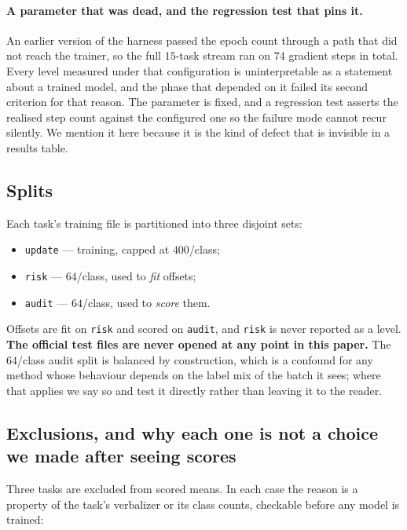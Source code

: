 \paragraph{A parameter that was dead, and the regression test that pins it.}
An earlier version of the harness passed the epoch count through a path that did
not reach the trainer, so the full $15$-task stream ran on $74$ gradient steps in
total. Every level measured under that configuration is uninterpretable as a
statement about a trained model, and the phase that depended on it failed its
second criterion for that reason. The parameter is fixed, and a regression test
asserts the realised step count against the configured one so the failure mode
cannot recur silently. We mention it here because it is the kind of defect that is
invisible in a results table.

\subsection{Splits}
\label{app:splits}

Each task's training file is partitioned into three disjoint sets:
\begin{itemize}
  \item \texttt{update} --- training, capped at $400$/class;
  \item \texttt{risk} --- $64$/class, used to \emph{fit} offsets;
  \item \texttt{audit} --- $64$/class, used to \emph{score} them.
\end{itemize}
Offsets are fit on \texttt{risk} and scored on \texttt{audit}, and \texttt{risk} is
never reported as a level. \textbf{The official test files are never opened at any
point in this paper.} The $64$/class audit split is balanced by construction, which
is a confound for any method whose behaviour depends on the label mix of the batch
it sees; where that applies we say so and test it directly rather than leaving it
to the reader.

\subsection{Exclusions, and why each one is not a choice we made after seeing scores}
\label{app:exclusions}

Three tasks are excluded from scored means. In each case the reason is a property
of the task's verbalizer or its class counts, checkable before any model is trained:


